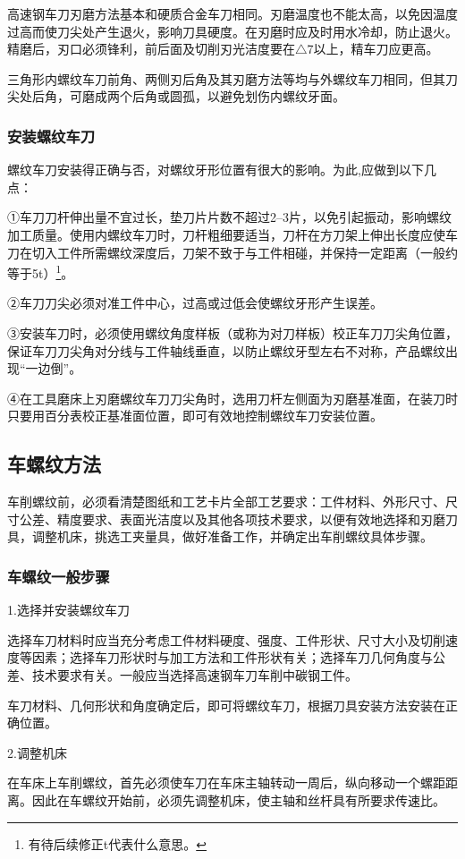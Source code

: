 \documentclass{ctexbook}
\begin{document}
高速钢车刀刃磨方法基本和硬质合金车刀相同。刃磨温度也不能太高，以免因温度过高而使刀尖处产生退火，影响刀具硬度。在刃磨时应及时用水冷却，防止退火。精磨后，刃口必须锋利，前后面及切削刃光洁度要在$\bigtriangleup$7以上，精车刀应更高。

三角形内螺纹车刀前角、两侧刃后角及其刃磨方法等均与外螺纹车刀相同，但其刀尖处后角，可磨成两个后角或圆孤，以避免划伤内螺纹牙面。
\subsubsection{安装螺纹车刀}
螺纹车刀安装得正确与否，对螺纹牙形位置有很大的影响。为此,应做到以下几点：

①车刀刀杆伸出量不宜过长，垫刀片片数不超过2--3片，以免引起振动，影响螺纹加工质量。使用内螺纹车刀时，刀杆粗细要适当，刀杆在方刀架上伸出长度应使车刀在切入工件所需螺纹深度后，刀架不致于与工件相碰，并保持一定距离（一般约等于5t）\footnote{有待后续修正t代表什么意思。}。

②车刀刀尖必须对准工件中心，过高或过低会使螺纹牙形产生误差。

③安装车刀时，必须使用螺纹角度样板（或称为对刀样板）校正车刀刀尖角位置，保证车刀刀尖角对分线与工件轴线垂直，以防止螺纹牙型左右不对称，产品螺纹出现“一边倒”。

④在工具磨床上刃磨螺纹车刀刀尖角时，选用刀杆左侧面为刃磨基准面，在装刀时只要用百分表校正基准面位置，即可有效地控制螺纹车刀安装位置。
\subsection{车螺纹方法}
车削螺纹前，必须看清楚图纸和工艺卡片全部工艺要求：工件材料、外形尺寸、尺寸公差、精度要求、表面光洁度以及其他各项技术要求，以便有效地选择和刃磨刀具，调整机床，挑选工夹量具，做好准备工作，并确定出车削螺纹具体步骤。
\subsubsection{车螺纹一般步骤}
1.选择并安装螺纹车刀

选择车刀材料时应当充分考虑工件材料硬度、强度、工件形状、尺寸大小及切削速度等因素；选择车刀形状时与加工方法和工件形状有关；选择车刀几何角度与公差、技术要求有关。一般应当选择高速钢车刀车削中碳钢工件。

车刀材料、几何形状和角度确定后，即可将螺纹车刀，根据刀具安装方法安装在正确位置。

2.调整机床

在车床上车削螺纹，首先必须使车刀在车床主轴转动一周后，纵向移动一个螺距距离。因此在车螺纹开始前，必须先调整机床，使主轴和丝杆具有所要求传速比。
\end{document}
